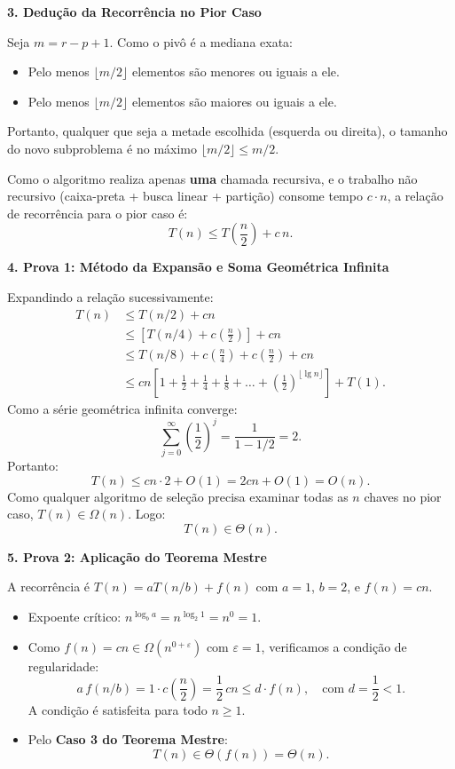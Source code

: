 \documentclass[11pt,a4paper]{article}
\newcommand{\res}[1]{\[\boxed{#1}\]}
\newcommand{\topico}[1]{\par\medskip\textbf{\color{azul}#1}\par}
\begin{document}
\topico{3. Dedução da Recorrência no Pior Caso}
Seja $m = r - p + 1$. Como o pivô é a mediana exata:
\begin{itemize}
    \item Pelo menos $\lfloor m/2 \rfloor$ elementos são menores ou iguais a ele.
    \item Pelo menos $\lfloor m/2 \rfloor$ elementos são maiores ou iguais a ele.
\end{itemize}
Portanto, qualquer que seja a metade escolhida (esquerda ou direita), o tamanho do novo subproblema é no máximo $\lfloor m/2 \rfloor \le m/2$.

Como o algoritmo realiza apenas \textbf{uma} chamada recursiva, e o trabalho não recursivo (caixa-preta + busca linear + partição) consome tempo $c \cdot n$, a relação de recorrência para o pior caso é:
\[
T(n) \le T\left(\frac{n}{2}\right) + c\,n.
\]

\topico{4. Prova 1: Método da Expansão e Soma Geométrica Infinita}
Expandindo a relação sucessivamente:
\begin{align*}
T(n) &\le T(n/2) + cn \\
     &\le \left[T(n/4) + c\left(\frac{n}{2}\right)\right] + cn \\
     &\le T(n/8) + c\left(\frac{n}{4}\right) + c\left(\frac{n}{2}\right) + cn \\
     &\le cn \left[ 1 + \frac{1}{2} + \frac{1}{4} + \frac{1}{8} + \dots + \left(\frac{1}{2}\right)^{\lfloor \lg n \rfloor} \right] + T(1).
\end{align*}
Como a série geométrica infinita converge:
\[
\sum_{j=0}^{\infty} \left(\frac{1}{2}\right)^j = \frac{1}{1 - 1/2} = 2.
\]
Portanto:
\[
T(n) \le cn \cdot 2 + O(1) = 2cn + O(1) = O(n).
\]
Como qualquer algoritmo de seleção precisa examinar todas as $n$ chaves no pior caso, $T(n) \in \Omega(n)$. Logo:
\res{T(n) \in \Theta(n).}

\topico{5. Prova 2: Aplicação do Teorema Mestre}
A recorrência é $T(n) = a T(n/b) + f(n)$ com $a = 1$, $b = 2$, e $f(n) = cn$.
\begin{itemize}
    \item Expoente crítico: $n^{\log_b a} = n^{\log_2 1} = n^0 = 1$.
    \item Como $f(n) = cn \in \Omega(n^{0 + \varepsilon})$ com $\varepsilon = 1$, verificamos a condição de regularidade:
    \[
    a\,f(n/b) = 1 \cdot c\left(\frac{n}{2}\right) = \frac{1}{2}\,cn \le d \cdot f(n), \quad \text{com } d = \frac{1}{2} < 1.
    \]
    A condição é satisfeita para todo $n \ge 1$.
    \item Pelo \textbf{Caso 3 do Teorema Mestre}:
    \[
    T(n) \in \Theta(f(n)) = \Theta(n).
    \]
\end{itemize}
\end{document}
